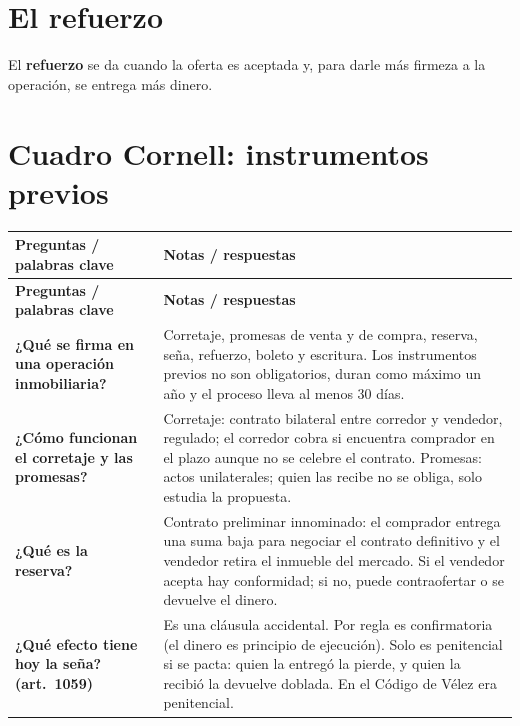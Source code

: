 \documentclass[12pt,oneside]{book}
\begin{document}
\section{El refuerzo}

El \textbf{refuerzo} se da cuando la oferta es aceptada y, para darle más firmeza a la operación, se entrega más dinero.

\section{Cuadro Cornell: instrumentos previos}

{\small
\begin{longtable}{@{}>{\raggedright\arraybackslash}p{}>{\raggedright\arraybackslash}p{}@{}}
\toprule
\textbf{Preguntas / palabras clave} & \textbf{Notas / respuestas} \\
\midrule
\endfirsthead
\toprule
\textbf{Preguntas / palabras clave} & \textbf{Notas / respuestas} \\
\midrule
\endhead
\bottomrule
\endfoot

\textbf{¿Qué se firma en una operación inmobiliaria?} &
Corretaje, promesas de venta y de compra, reserva, seña, refuerzo, boleto y escritura. Los instrumentos previos no son obligatorios, duran como máximo un año y el proceso lleva al menos 30 días. \\[0.6em]

\textbf{¿Cómo funcionan el corretaje y las promesas?} &
Corretaje: contrato bilateral entre corredor y vendedor, regulado; el corredor cobra si encuentra comprador en el plazo aunque no se celebre el contrato. Promesas: actos unilaterales; quien las recibe no se obliga, solo estudia la propuesta. \\[0.6em]

\textbf{¿Qué es la reserva?} &
Contrato preliminar innominado: el comprador entrega una suma baja para negociar el contrato definitivo y el vendedor retira el inmueble del mercado. Si el vendedor acepta hay conformidad; si no, puede contraofertar o se devuelve el dinero. \\[0.6em]

\textbf{¿Qué efecto tiene hoy la seña? (art.~1059)} &
Es una cláusula accidental. Por regla es confirmatoria (el dinero es principio de ejecución). Solo es penitencial si se pacta: quien la entregó la pierde, y quien la recibió la devuelve doblada. En el Código de Vélez era penitencial. \\[0.6em]


\end{longtable}}
\end{document}
